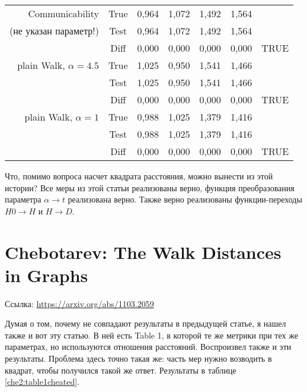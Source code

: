 \documentclass{article}
\begin{document}
\begin{table}[H]
\begin{center}
\begin{tabular}{rc|cccc|c}
                         \hline
Communicability & True & 0,964       & 1,072       & 1,492       & 1,564       &        \\
(не указан параметр!) & Test & 0,964       & 1,072       & 1,492       & 1,564       &        \\
                         & Diff & 0,000       & 0,000       & 0,000       & 0,000       & TRUE   \\
                         \hline
plain Walk, $\alpha=4.5$    & True & 1,025       & 0,950       & 1,541       & 1,466       &        \\
                         & Test & 1,025       & 0,950       & 1,541       & 1,466       &        \\
                         & Diff & 0,000       & 0,000       & 0,000       & 0,000       & TRUE  \\
                         \hline
plain Walk, $\alpha=1$       & True & 0,988       & 1,025       & 1,379       & 1,416       &        \\
                         & Test & 0,988       & 1,025       & 1,379       & 1,416       &        \\
                         & Diff & 0,000       & 0,000       & 0,000       & 0,000       & TRUE   \\ 
    \end{tabular}
  \end{center}
  \label{cha1:fig1cheated}
\end{table}

Что, помимо вопроса насчет квадрата расстояния, можно вынести из этой истории?
Все меры из этой статьи реализованы верно, функция преобразования параметра $\alpha \rightarrow t$ реализована верно. Также верно реализованы функции-переходы $H0 \rightarrow H$ и $H \rightarrow D$.

\section{Chebotarev: The Walk Distances in Graphs}
Ссылка: \url{https://arxiv.org/abs/1103.2059}

Думая о том, почему не совпадают результаты в предыдущей статье, я нашел также и вот эту статью. В ней есть Table 1, в которой те же метрики при тех же параметрах, но используются отношения расстояний. Воспроизвел также и эти результаты. Проблема здесь точно такая же: часть мер нужно возводить в квадрат, чтобы получился такой же ответ. Результаты в таблице \ref{che2:table1cheated}.
\end{document}
